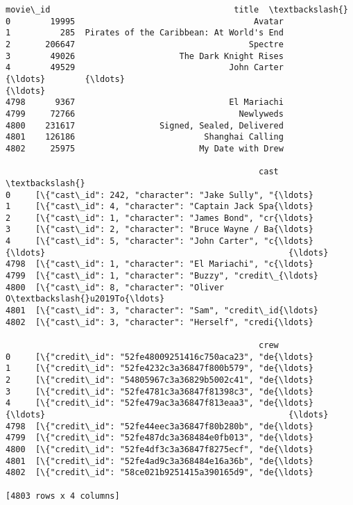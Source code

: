 \documentclass[11pt]{article}
\makeatletter
\newcommand{\boxspacing}{\kern\kvtcb@left@rule\kern\kvtcb@boxsep}
\newcommand{\prompt}[4]{
        {\ttfamily\llap{{\color{#2}[#3]:\hspace{3pt}#4}}\vspace{-\baselineskip}}
    }
\makeatother
\begin{document}
            \begin{tcolorbox}[breakable, size=fbox, boxrule=.5pt, pad at break*=1mm, opacityfill=0]
\prompt{Out}{outcolor}{5}{\boxspacing}
\begin{Verbatim}[commandchars=\\\{\}]
      movie\_id                                     title  \textbackslash{}
0        19995                                    Avatar
1          285  Pirates of the Caribbean: At World's End
2       206647                                   Spectre
3        49026                     The Dark Knight Rises
4        49529                               John Carter
{\ldots}        {\ldots}                                       {\ldots}
4798      9367                               El Mariachi
4799     72766                                 Newlyweds
4800    231617                 Signed, Sealed, Delivered
4801    126186                          Shanghai Calling
4802     25975                         My Date with Drew

                                                   cast  \textbackslash{}
0     [\{"cast\_id": 242, "character": "Jake Sully", "{\ldots}
1     [\{"cast\_id": 4, "character": "Captain Jack Spa{\ldots}
2     [\{"cast\_id": 1, "character": "James Bond", "cr{\ldots}
3     [\{"cast\_id": 2, "character": "Bruce Wayne / Ba{\ldots}
4     [\{"cast\_id": 5, "character": "John Carter", "c{\ldots}
{\ldots}                                                 {\ldots}
4798  [\{"cast\_id": 1, "character": "El Mariachi", "c{\ldots}
4799  [\{"cast\_id": 1, "character": "Buzzy", "credit\_{\ldots}
4800  [\{"cast\_id": 8, "character": "Oliver O\textbackslash{}u2019To{\ldots}
4801  [\{"cast\_id": 3, "character": "Sam", "credit\_id{\ldots}
4802  [\{"cast\_id": 3, "character": "Herself", "credi{\ldots}

                                                   crew
0     [\{"credit\_id": "52fe48009251416c750aca23", "de{\ldots}
1     [\{"credit\_id": "52fe4232c3a36847f800b579", "de{\ldots}
2     [\{"credit\_id": "54805967c3a36829b5002c41", "de{\ldots}
3     [\{"credit\_id": "52fe4781c3a36847f81398c3", "de{\ldots}
4     [\{"credit\_id": "52fe479ac3a36847f813eaa3", "de{\ldots}
{\ldots}                                                 {\ldots}
4798  [\{"credit\_id": "52fe44eec3a36847f80b280b", "de{\ldots}
4799  [\{"credit\_id": "52fe487dc3a368484e0fb013", "de{\ldots}
4800  [\{"credit\_id": "52fe4df3c3a36847f8275ecf", "de{\ldots}
4801  [\{"credit\_id": "52fe4ad9c3a368484e16a36b", "de{\ldots}
4802  [\{"credit\_id": "58ce021b9251415a390165d9", "de{\ldots}

[4803 rows x 4 columns]
\end{Verbatim}
\end{tcolorbox}
        
\end{document}
